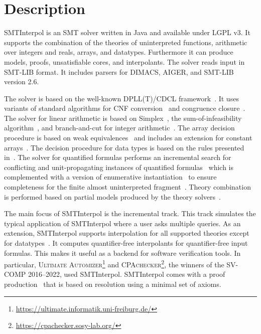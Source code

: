 \documentclass[a4paper]{easychair}
\title{\SI\\{\large Version \version}}
\author{Jochen Hoenicke\inst{1} \and Tanja Schindler\inst{2}}
\institute{
  Certora, \email{jochen@certora.com} \and
  University of Li\`{e}ge, \email{tanja.schindler@uliege.be}
}
\newcommand\SI{SMTInterpol\xspace}
\begin{document}
\maketitle
\section*{Description}
\SI is an SMT solver written in Java and available under LGPL v3.
It supports the combination of the theories of uninterpreted functions, arithmetic over integers and reals, arrays, and datatypes.
Furthermore it can produce models, proofs, unsatisfiable cores, and interpolants.
The solver reads input in SMT-LIB format.
It includes parsers for DIMACS, AIGER, and SMT-LIB version 2.6.

The solver is based on the well-known DPLL(T)/CDCL framework~\cite{DBLP:conf/cav/GanzingerHNOT04}.
It uses variants of standard algorithms for CNF conversion~\cite{DBLP:journals/jsc/PlaistedG86} and congruence closure~\cite{DBLP:conf/rta/NieuwenhuisO05}.
The solver for linear arithmetic is based on Simplex~\cite{DBLP:conf/cav/DutertreM06}, the sum-of-infeasibility algorithm~\cite{DBLP:conf/fmcad/KingBD13}, and branch-and-cut for integer arithmetic~\cite{DBLP:conf/cav/ChristH15,DBLP:conf/cav/DilligDA09}.
The array decision procedure is based on weak equivalences~\cite{DBLP:conf/frocos/ChristH15} and includes an extension for constant arrays~\cite{DBLP:conf/vmcai/HoenickeS19}.
The decision procedure for data types is based on the rules presented in~\cite{DBLP:journals/jsat/BarrettST07}.
The solver for quantified formulas performs an incremental search for conflicting and unit-propagating instances of quantified formulas~\cite{DBLP:conf/vmcai/HoenickeS21} which is complemented with a version of enumerative instantiation~\cite{DBLP:conf/tacas/ReynoldsBF18} to ensure completeness for the finite almost uninterpreted fragment~\cite{DBLP:conf/cav/GeM09}.
Theory combination is performed based on partial models produced by the theory solvers~\cite{DBLP:journals/entcs/MouraB08}.

The main focus of \SI is the incremental track.
This track simulates the typical application of \SI where a user asks multiple queries.
As an extension, \SI supports interpolation for all supported theories except for datatypes~\cite{DBLP:journals/jar/ChristH16,DBLP:conf/cade/HoenickeS18,DBLP:conf/vmcai/HoenickeS19,DBLP:conf/smt/HenkelHS21}.  It computes quantifier-free interpolants for quantifier-free input formulas.
This makes it useful as a backend for software verification tools.
In particular, \textsc{Ultimate Automizer}\footnote{\url{https://ultimate.informatik.uni-freiburg.de/}} and \textsc{CPAchecker}\footnote{\url{https://cpachecker.sosy-lab.org/}}, the winners of the SV-COMP 2016--2022, used \SI.
\SI comes with a proof production~\cite{DBLP:conf/smt/HoenickeS22} that is based on resolution using a minimal set of axioms.
\end{document}
